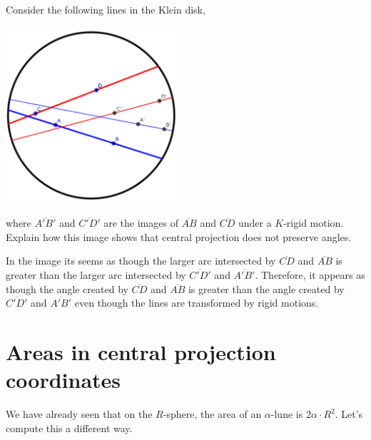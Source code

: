 \documentclass[newpage,hints,handout]{ximera}
\begin{document}
\begin{problem}
  Consider the following lines in the Klein disk,
  \begin{image}
    \includegraphics[width=2.5in]{kleinDiskNonConformal.png}
  \end{image}
  where $\overline{A'B'}$ and $\overline{C'D'}$ are the images of
  $\overline{AB}$ and $\overline{CD}$ under a $K$-rigid
  motion. Explain how this image shows that central projection does
  not preserve angles.
  
  \begin{freeResponse}
  In the image its seems as though the larger arc intersected by $\overline{CD}$ and $\overline{AB}$ is greater than the larger arc intersected by $\overline{C'D'}$ and $\overline{A'B'}$. Therefore, it appears as though the angle created by $\overline{CD}$ and $\overline{AB}$ is greater than the angle created by $\overline{C'D'}$ and $\overline{A'B'}$ even though the lines are transformed by rigid motions. 
  \end{freeResponse}
\end{problem}


\section{Areas in central projection coordinates}



We have already seen that on the $R$-sphere, the area of an
$\alpha$-lune is $2\alpha\cdot R^2$. Let's compute this a different
way.
\end{document}
